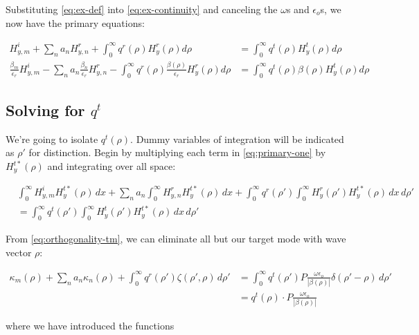 \documentclass[11pt, oneside]{article}   	%
\begin{document}
\noindent Substituting \eqref{eq:ex-def} into \eqref{eq:ex-continuity} and canceling the $\omega$s and $\epsilon_{o}$s, we now have the primary equations:

\begin{align}
H_{y,m}^{i} + \sum_{n} a_{n} H_{y,n}^{r} + \int_{0}^{\infty} q^{r} (\rho) H_{y}^{r} (\rho) d\rho &= \int_{0}^{\infty} q^{t} (\rho) H_{y}^{t} (\rho) d\rho \label{eq:primary-one}\\
\frac{\beta_{m}}{\epsilon_{r}} H_{y,m}^{i} - \sum_{n} a_{n} \frac{\beta_{n}}{\epsilon_{r}} H_{y,n}^{r} - \int_{0}^{\infty} q^{r} (\rho) \frac{\beta (\rho)}{\epsilon_{r}} H_{y}^{r} (\rho) d\rho &= \int_{0}^{\infty} q^{t} (\rho) \beta (\rho)H_{y}^{t} (\rho) d\rho \label{eq:primary-two}
\end{align} 

\subsection{Solving for $q^{t}$}
\label{sec:qt-tm}

We're going to isolate $q^{t}(\rho)$. Dummy variables of integration will be indicated as $\rho '$ for distinction. Begin by multiplying each term in \eqref{eq:primary-one} by $ H_{y}^{t*}(\rho)$ and integrating over all space:

\begin{align}
&\int_{0}^{\infty} H_{y,m}^{i} H_{y}^{t*}(\rho) \, dx
+ \sum_{n} a_{n} \int_{0}^{\infty}  H_{y,n}^{r} H_{y}^{t*}(\rho) \, dx 
+ \int_{0}^{\infty} q^{r} (\rho ') \int_{0}^{\infty} H_{y}^{r} (\rho ') H_{y}^{t*} (\rho) \, dx \, d\rho ' \nonumber \\
&= \int_{0}^{\infty} q^{t} (\rho ') \int_{0}^{\infty} H_{y}^{t} (\rho ') H_{y}^{t*} (\rho) \, dx \, d\rho '
\end{align}

\noindent From \eqref{eq:orthogonality-tm}, we can eliminate all but our target mode with wave vector $\rho$:

\begin{align}
\kappa_{m}(\rho)
+ \sum_{n} a_{n} \kappa_{n}(\rho)
+ \int_{0}^{\infty} q^{r} (\rho ') \zeta(\rho ',\rho) \, d\rho '
&= \int_{0}^{\infty} q^{t} (\rho ') P \frac{\omega \epsilon_{o}}{|\beta (\rho)|} \delta (\rho '-\rho) \, d\rho ' \nonumber \\
&= q^{t}(\rho) \cdot P \frac{\omega \epsilon_{o}}{|\beta (\rho)|}
\label{eq:orthogonalized-one-qt-tm}
\end{align}

\noindent where we have introduced the functions
\end{document}
